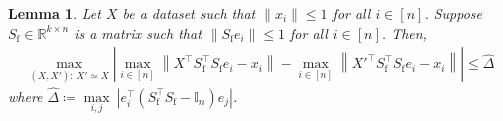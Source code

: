 \documentclass[11pt]{article}
\newtheorem{lem}{Lemma}
\theoremstyle{definition}
\theoremstyle{plain}
\newcommand{\reals}{\mathbb{R}}
\providecommand{\brI}{\mathbb{I}}
\newcommand{\abs}[1]{\left| #1 \right|}
\newcommand{\Norm}[1]{\left\| #1 \right\|}
\providecommand{\norm}[1]{\Norm{#1}}
\begin{document}
\begin{lem}
\label{lem:sensitivity_M}
Let \(X\) be a dataset such that \(\|x_{i}\| \leq 1\) for all \(i \in [n]\).
    Suppose \(S_{\mathrm{f}} \in \reals^{k \times n}\) is a matrix such that \(\|S_{\mathrm{f}}e_{i}\| \leq 1\) for all \(i \in [n]\).
Then, 
\begin{align}
    \max_{(X,X'):\,X'\simeq X}\abs{\underset{i\in[n]}{\max}\norm{X^\top S_{\mathrm{f}}^{\top}S_{\mathrm{f}}e_i - x_i} - \underset{i\in[n]}{\max}\norm{X'^\top S_{\mathrm{f}}^{\top}S_{\mathrm{f}}e_i - x_i}} \leq \widehat{\Delta}
\end{align}
where $\widehat{\Delta} \coloneq \underset{i,j}{\max} \ \abs{e^{\top}_i\left(S_{\mathrm{f}}^{\top}S_{\mathrm{f}} - \brI_n\right)e_j}$.
\end{lem}
\end{document}
